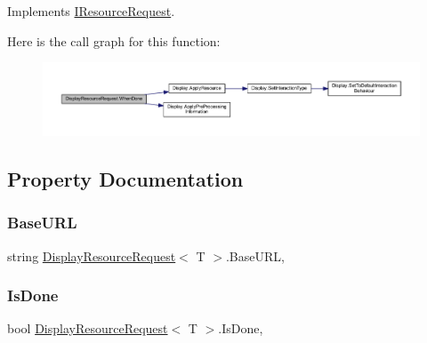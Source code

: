 Implements \mbox{\hyperlink{interface_i_resource_request_a056e427fa6233602456ccb2d4c405aa0}{I\+Resource\+Request}}.

Here is the call graph for this function\+:
\nopagebreak
\begin{figure}[H]
\begin{center}
\leavevmode
\includegraphics[width=350pt]{class_display_resource_request_a60a8a75088ba20c6c42ebcab8309f1de_cgraph}
\end{center}
\end{figure}


\subsection{Property Documentation}
\mbox{\label{class_display_resource_request_ab299093412d9885b2b59b8df67683444}} 
\subsubsection{\texorpdfstring{Base\+U\+RL}{BaseURL}}
{\footnotesize\ttfamily string \mbox{\hyperlink{class_display_resource_request}{Display\+Resource\+Request}}$<$ T $>$.Base\+U\+RL\hspace{0.3cm}{\ttfamily [get]}, {\ttfamily [set]}}

\mbox{\label{class_display_resource_request_afbe053e1527c852172eb72aa2edb8339}} 
\subsubsection{\texorpdfstring{Is\+Done}{IsDone}}
{\footnotesize\ttfamily bool \mbox{\hyperlink{class_display_resource_request}{Display\+Resource\+Request}}$<$ T $>$.Is\+Done\hspace{0.3cm}{\ttfamily [get]}, {}}

